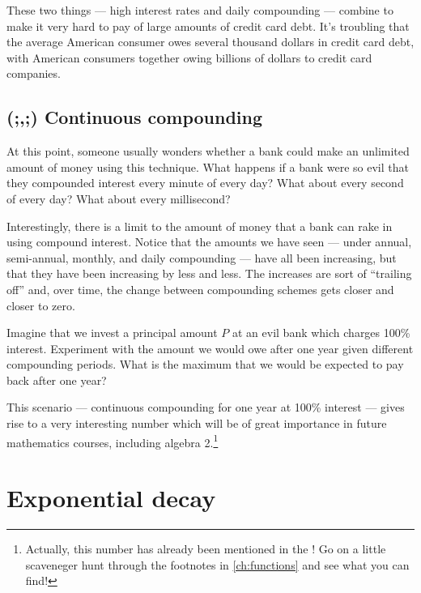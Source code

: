 These two things --- high interest rates and daily compounding --- combine to make it very hard to pay of large amounts of credit card debt. It's troubling that the average American consumer owes several thousand dollars in credit card debt, with American consumers together owing billions of dollars to credit card companies.


\subsection{(;,;) Continuous compounding}

At this point, someone usually wonders whether a bank could make an unlimited amount of money using this technique. What happens if a bank were so evil that they compounded interest every minute of every day? What about every second of every day? What about every millisecond?

Interestingly, there is a limit to the amount of money that a bank can rake in using compound interest. Notice that the amounts we have seen --- under annual, semi-annual, monthly, and daily compounding --- have all been increasing, but that they have been increasing by less and less. The increases are sort of ``trailing off'' and, over time, the change between compounding schemes gets closer and closer to zero.

\begin{boxedexplore}

Imagine that we invest a principal amount $P$ at an evil bank which charges 100\% interest. Experiment with the amount we would owe after one year given different compounding periods. What is the maximum that we would be expected to pay back after one year?
\end{boxedexplore}

This scenario --- continuous compounding for one year at 100\% interest --- gives rise to a very interesting number which will be of great importance in future mathematics courses, including algebra 2.\footnote{Actually, this number has already been mentioned in the \algebranomicon! Go on a little scaveneger hunt through the footnotes in \cref{ch:functions} and see what you can find!}

\section{Exponential decay}
\label{sec:expodecay}

